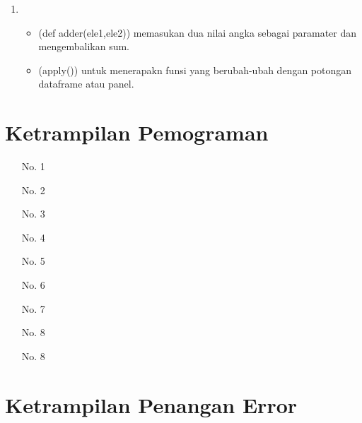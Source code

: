 \documentclass[12pt]{article}
\begin{document}
\begin{enumerate}
\begin{itemize}
		\end{itemize}
		
		\item 
		\begin{itemize}
		 \item (def adder(ele1,ele2)) memasukan dua nilai angka sebagai paramater dan mengembalikan sum.
		\item (apply()) untuk menerapakn funsi yang berubah-ubah dengan potongan dataframe atau panel.
		\end{itemize}
		
	\end{enumerate}
	
\section{Ketrampilan Pemograman}

\begin{enumerate}
	\item[No. 1] 
	
	\item[No. 2] 
	
	\item[No. 3]
	
	\item[No. 4]
	
	\item[No. 5]
	
	\item[No. 6]
	
	\item[No. 7]
	
	\item[No. 8]
	
	\item[No. 8]
	
\end{enumerate}

\section{Ketrampilan Penangan Error}
\end{document}
